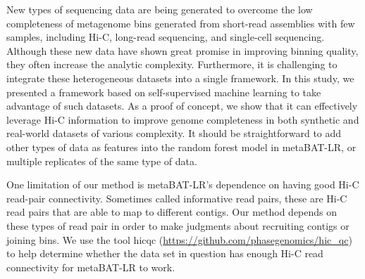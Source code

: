 \documentclass[fleqn,10pt,lineno]{wlpeerj}
\begin{document}
New types of sequencing data are being generated to overcome the low completeness of metagenome bins generated from short-read assemblies with few samples, including Hi-C, long-read sequencing, and single-cell sequencing. Although these new data have shown great promise in improving binning quality, they often increase the analytic complexity. Furthermore, it is challenging to integrate these heterogeneous datasets into a single framework. In this study, we presented a framework based on self-supervised machine learning to take advantage of such datasets. As a proof of concept, we show that it can effectively leverage Hi-C information to improve genome completeness in both synthetic and real-world datasets of various complexity. It should be straightforward to add other types of data as features into the random forest model in metaBAT-LR, or multiple replicates of the same type of data. 


One limitation of our method is metaBAT-LR's dependence on having good Hi-C read-pair connectivity. Sometimes called informative read pairs, these are Hi-C read pairs that are able to map to different contigs. Our method depends on these types of read pair in order to make judgments about recruiting contigs or joining bins. We use the tool hic\textunderscore qc (\url{https://github.com/phasegenomics/hic_qc}) to help determine whether the data set in question has enough Hi-C read connectivity for metaBAT-LR to work.
\end{document}
